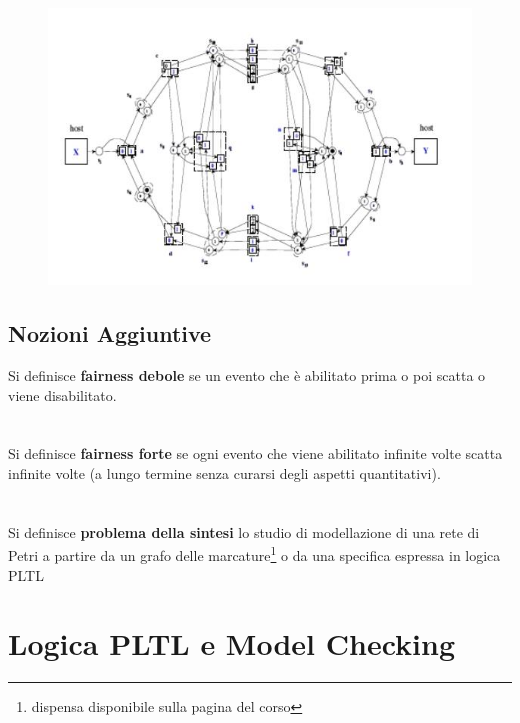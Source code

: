 \documentclass[a4paper,12pt, oneside]{book}
\begin{document}
\begin{figure}[H]
  \centering
  \includegraphics[scale = 0.72]{img/abt13.jpg}
\end{figure}
\section{Nozioni Aggiuntive}
\begin{definizione}
  Si definisce \textbf{fairness debole} se un evento che è abilitato prima o poi
  scatta o viene disabilitato.\\\\\\
  Si definisce \textbf{fairness forte} se ogni evento che viene abilitato
  infinite volte scatta infinite volte (a lungo termine senza curarsi degli
  aspetti quantitativi).\\\\\\
  Si definisce \textbf{problema della sintesi} lo studio di modellazione di una
  rete di Petri a partire da un grafo delle marcature\footnote{dispensa
    disponibile sulla pagina del corso} o da una specifica
  espressa in logica PLTL
\end{definizione}
\chapter{Logica PLTL e Model Checking}
\end{document}

